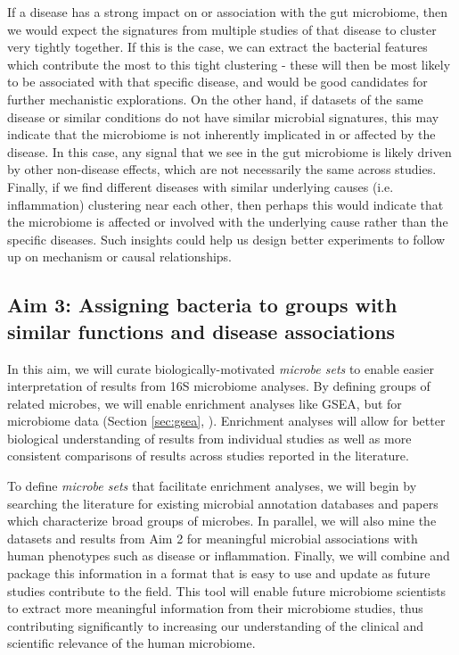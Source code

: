 \documentclass[12pt]{article}
\begin{document}
If a disease has a strong impact on or association with the gut 
microbiome, then we would expect the signatures from multiple studies of that disease
to cluster very tightly together. If this is the case, we can extract 
the bacterial features which contribute the most to this tight 
clustering - these will then be most likely to be associated with that 
specific disease, and would be good candidates for further mechanistic 
explorations. On the other hand, if datasets of the same disease or 
similar conditions do not have similar microbial signatures, this may 
indicate that the microbiome is not inherently implicated in or affected 
by the disease. In this case, any signal that we see in the gut 
microbiome is likely driven by other non-disease effects, which are 
not necessarily the same across studies. Finally, if we find different 
diseases with similar underlying causes (i.e. inflammation) clustering 
near each other, then perhaps this would indicate that the microbiome 
is affected or involved with the underlying cause rather than the 
specific diseases. Such insights could help us design better 
experiments to follow up on mechanism or causal relationships.

\subsection{Aim 3: Assigning bacteria to groups with similar functions and disease associations}

In this aim, we will curate biologically-motivated \textit{microbe 
sets} to enable easier interpretation of results from 16S microbiome 
analyses. By defining groups of related microbes, we 
will enable enrichment analyses like GSEA, but for microbiome data (Section \ref{sec:gsea}, 
\cite{subramanian-gsea-2005}). Enrichment analyses will allow for better 
biological understanding of results from individual studies as well as 
more consistent comparisons of results across studies reported in 
the literature.

To define \textit{microbe sets} that facilitate enrichment analyses, we will
begin by searching the literature for existing microbial annotation
databases and papers which characterize broad groups of microbes.
In parallel, we will also mine the datasets and results from Aim 2
for meaningful microbial associations with human phenotypes such as
disease or inflammation. Finally, we will combine and package this information
in a format that is easy to use and update as future studies contribute
to the field. This tool will enable future microbiome scientists to extract more
meaningful information from their microbiome studies, thus
contributing significantly to increasing our understanding of the
clinical and scientific relevance of the human microbiome.
\end{document}
